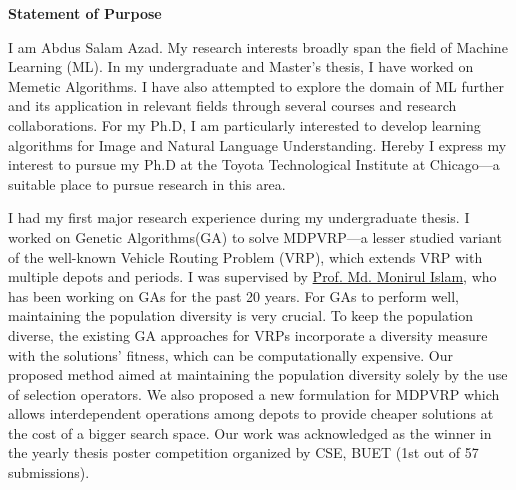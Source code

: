 \documentclass[12pt]{article}
\begin{document}


\fancyhf{}
\rfoot{\thepage}

\begin{center}
{\LARGE \bf 
Statement of Purpose}\\
\end{center}



I am Abdus Salam Azad. My research interests broadly span the field of Machine Learning (ML). In my undergraduate and Master's thesis, I have worked on Memetic Algorithms. I have also attempted to explore the domain of ML further and its application in relevant fields through several courses and research collaborations. For my Ph.D, I am particularly interested to develop learning algorithms for Image and Natural Language Understanding. Hereby I express my interest to pursue my Ph.D at the Toyota Technological Institute at Chicago---a suitable place to pursue research in this area. 

I had my first major research experience during my undergraduate thesis. I worked on Genetic Algorithms(GA) to solve MDPVRP---a lesser studied variant of the well-known Vehicle Routing Problem (VRP), which extends VRP with multiple depots and periods. I was supervised by \href{http://cse.buet.ac.bd/faculty/facdetail.php?id=mdmonirulislam}{Prof. Md. Monirul Islam}, who has been working on GAs for the past 20 years. For GAs to perform well, maintaining the population diversity is very crucial. To keep the population diverse, the existing GA approaches for VRPs incorporate a diversity measure with the solutions' fitness, which can be computationally expensive. Our proposed method aimed at maintaining the population diversity solely by the use of selection operators. We also proposed a new formulation for MDPVRP which allows interdependent operations among depots to provide cheaper solutions at the cost of a bigger search space. Our work was acknowledged as the winner in the yearly thesis poster competition organized by CSE, BUET (1st out of 57 submissions).
\end{document}
